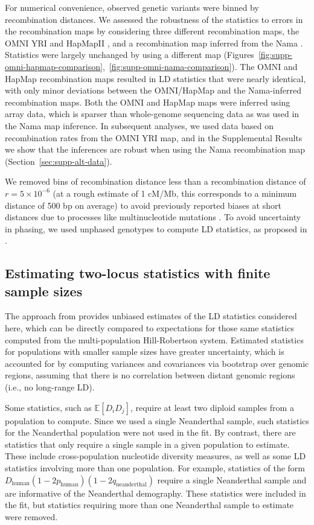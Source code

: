 \documentclass[]{article}
\newcommand{\E}{\mathbb{E}}
\begin{document}
For numerical convenience, observed genetic variants were binned by
recombination distances. We assessed the robustness of the statistics to errors
in the recombination maps by considering three different recombination maps,
the OMNI YRI and HapMapII
\citep{1000_Genomes_Project_Consortium2015-zq,International_HapMap_Consortium2007-vn},
and a recombination map inferred from the Nama \citep{Van_Eeden2021-od}.
Statistics were largely unchanged by using a different map
(Figures~\ref{fig:supp-omni-hapmap-comparison},~\ref{fig:supp-omni-nama-comparison}).
The OMNI and HapMap recombination maps resulted in LD statistics that were
nearly identical, with only minor deviations between the OMNI/HapMap and the
Nama-inferred recombination maps. Both the OMNI and HapMap maps were inferred
using array data, which is sparser than whole-genome sequencing data as was
used in the Nama map inference. In subsequent analyses, we used data based on
recombination rates from the OMNI YRI map, and in the Supplemental Results we
show that the inferences are robust when using the Nama recombination map
(Section~\ref{sec:supp-alt-data}).

We removed bins of recombination distance less than a recombination distance of
$r = 5\times10^{-6}$ (at a rough estimate of 1 cM/Mb, this corresponds to a minimum
distance of 500 bp on average) to avoid previously reported biases at short
distances due to processes like multinucleotide mutations
\citep{Harris2014-zg,Ragsdale2019-nt}. To avoid uncertainty in phasing, we used
unphased genotypes to compute LD statistics, as proposed in
\citet{Ragsdale2020-nz}. 

\subsection{Estimating two-locus statistics with finite sample sizes}

The approach from \citet{Ragsdale2020-nz} provides unbiased estimates of the LD
statistics considered here, which can be directly compared to expectations for
those same statistics computed from the multi-population Hill-Robertson system.
Estimated statistics for populations with smaller sample sizes have greater
uncertainty, which is accounted for by computing variances and covariances via
bootstrap over genomic regions, assuming that there is no correlation between
distant genomic regions (i.e., no long-range LD).

Some statistics, such as $\E[D_i D_j]$, require at least two diploid samples
from a population to compute. Since we used a single Neanderthal sample, such
statistics for the Neanderthal population were not used in the fit. By contrast,
there are statistics that only require a single sample in a given population to
estimate. These include cross-population nucleotide diversity measures, as well
as some LD statistics involving more than one population. For example,
statistics of the form
$D_{\text{human}}(1-2p_{\text{human}})(1-2q_{\text{neanderthal}})$ require a
single Neanderthal sample and are informative of the Neanderthal demography.
These statistics were included in the fit, but statistics requiring more than
one Neanderthal sample to estimate were removed.
\end{document}

